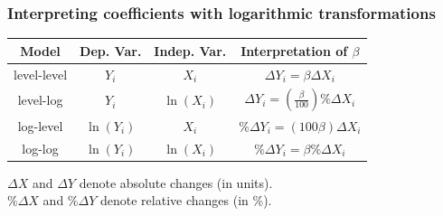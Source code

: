 \documentclass[11pt, aspectratio = 169]{beamer}
\begin{document}
\begin{frame}
\frametitle{Interpreting coefficients with logarithmic transformations}
 
\begin{center}
\begin{tabular}{|c|c|c|c|}
  \hline
  \textbf{Model} & \textbf{Dep. Var.} & \textbf{Indep. Var.} & \textbf{Interpretation of $\beta$} \\
  \hline
  level-level & $Y_i$    & $X_i$      & $\Delta Y_i = \beta \Delta X_i$ \\
  level-log   & $Y_i$     & $\ln(X_i)$  & $\Delta Y_i = \left(\frac{\beta}{100}\right) \% \Delta X_i$\\
  log-level   & $\ln(Y_i)$ & $X_i$      & $\% \Delta Y_i = (100 \beta) \Delta X_i$ \\
  log-log     & $\ln(Y_i)$ & $\ln(X_i)$  & $\% \Delta Y_i = \beta \% \Delta X_i$ \\
  \hline
\end{tabular}
\end{center}
$\Delta X$ and $\Delta Y$ denote absolute changes (in units). \\
$\%\Delta X$ and $\%\Delta Y$ denote relative changes (in \%). 
\end{frame}
\end{document}
